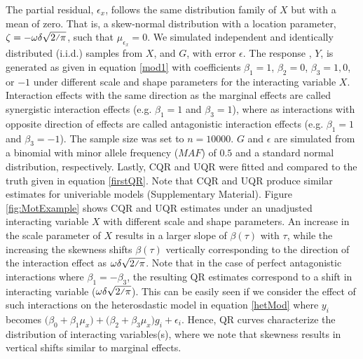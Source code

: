 \documentclass[12pt]{article}
\newcommand\vfrac[2]{\ThisStyle{%
  \setbox0=\hbox{$\SavedStyle#1#2$}%
  \setbox2=\hbox{$\SavedStyle X$}%
  \ifdim\ht0>\ht2\setlength{\ht0}{\ht2}\fi%
  #1\mathord{\stretchto{\raisebox{2.3\LMpt}{$\SavedStyle/$}}{\ht0}}#2}}
\begin{document}
\begin{appendices}
The partial residual, $\epsilon_x$, follows the same distribution family of $X$ but with a mean of zero. That is, a skew-normal distribution with a location parameter, $\zeta=-\omega \delta \sqrt{\vfrac{2}{\pi}}$, such that $\mu_{\epsilon_x} =0$. We simulated independent and identically distributed (i.i.d.) samples from $X$, and $G$, with error $\epsilon$. The response , $Y$, is generated as given in equation \ref{mod1} with coefficients $\beta_1=1$, $\beta_2=0$, $\beta_3=1, 0$, or $-1$ under different scale and shape parameters for the interacting variable $X$. Interaction effects with the same direction as the marginal effects are called synergistic interaction effects (e.g. $\beta_1=1$ and $\beta_3=1$), where as interactions with opposite direction of effects are called antagonistic interaction effects (e.g. $\beta_1=1$ and $\beta_3=-1$). The sample size was set to $n=10000$. $G$ and $\epsilon$ are simulated from a binomial with minor allele frequency ($MAF$) of $0.5$ and a standard normal distribution, respectively. Lastly, CQR and UQR were fitted and compared to the truth given in equation \ref{firstQR}. Note that CQR and UQR produce similar estimates for univeriable models (Supplementary Material). Figure \ref{fig:MotExample} shows CQR and UQR estimates under an unadjusted interacting variable $X$ with different scale and shape parameters. An increase in the scale parameter of $X$ results in a larger slope of $\beta(\tau)$ with $\tau$, while the increasing the skewness shifts $\beta(\tau)$ vertically corresponding to the direction of the interaction effect as $\omega\delta \sqrt{\vfrac{2}{\pi}}$. Note that in the case of perfect antagonistic interactions where $\beta_1=-\beta_3$, the resulting QR estimates correspond to a shift in interacting variable ($\omega\delta \sqrt{\vfrac{2}{\pi}}$). This can be easily seen if we consider the effect of such interactions on the heterosdastic model in equation \ref{hetMod} where $y_i$ becomes $\big(\beta_0+\beta_1 \mu_x\big) + \big(\beta_2 + \beta_3 \mu_x\big)g_i + \epsilon_{i}$. Hence, QR curves characterize the distribution of interacting variables(s), where we note that skewness results in vertical shifts similar to marginal effects. 


\end{appendices}
\end{document}
